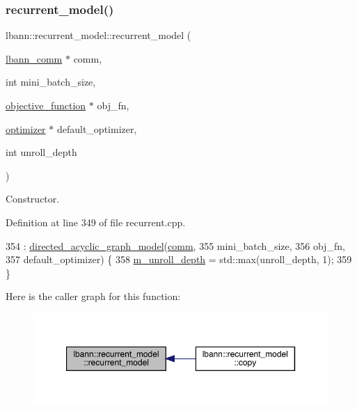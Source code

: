 \subsubsection{\texorpdfstring{recurrent\+\_\+model()}{recurrent\_model()}\hspace{0.1cm}{\footnotesize\ttfamily [1/2]}}
{\footnotesize\ttfamily lbann\+::recurrent\+\_\+model\+::recurrent\+\_\+model (\begin{DoxyParamCaption}\item[{\hyperlink{classlbann_1_1lbann__comm}{lbann\+\_\+comm} $\ast$}]{comm,  }\item[{int}]{mini\+\_\+batch\+\_\+size,  }\item[{\hyperlink{classlbann_1_1objective__function}{objective\+\_\+function} $\ast$}]{obj\+\_\+fn,  }\item[{\hyperlink{classlbann_1_1optimizer}{optimizer} $\ast$}]{default\+\_\+optimizer,  }\item[{int}]{unroll\+\_\+depth }\end{DoxyParamCaption})}

Constructor. 

Definition at line 349 of file recurrent.\+cpp.


\begin{DoxyCode}
354   : \hyperlink{classlbann_1_1directed__acyclic__graph__model_a2b5f8058b341073a0a95d4882fb4ff52}{directed\_acyclic\_graph\_model}(\hyperlink{file__io_8cpp_ab048c6f9fcbcfaa57ce68b00263dbebe}{comm},
355                                  mini\_batch\_size,
356                                  obj\_fn,
357                                  default\_optimizer) \{
358   \hyperlink{classlbann_1_1recurrent__model_a71eb93ebf3411a5c170f6570c93e3cca}{m\_unroll\_depth} = std::max(unroll\_depth, 1);
359 \}
\end{DoxyCode}
Here is the caller graph for this function\+:\nopagebreak
\begin{figure}[H]
\begin{center}
\leavevmode
\includegraphics[width=350pt]{classlbann_1_1recurrent__model_ac1d3118a1642bd460c9cc9617a592a0b_icgraph}
\end{center}
\end{figure}
\mbox{\label{classlbann_1_1recurrent__model_adc71cbd387e03acc05a0f2e77aa36457}} 

